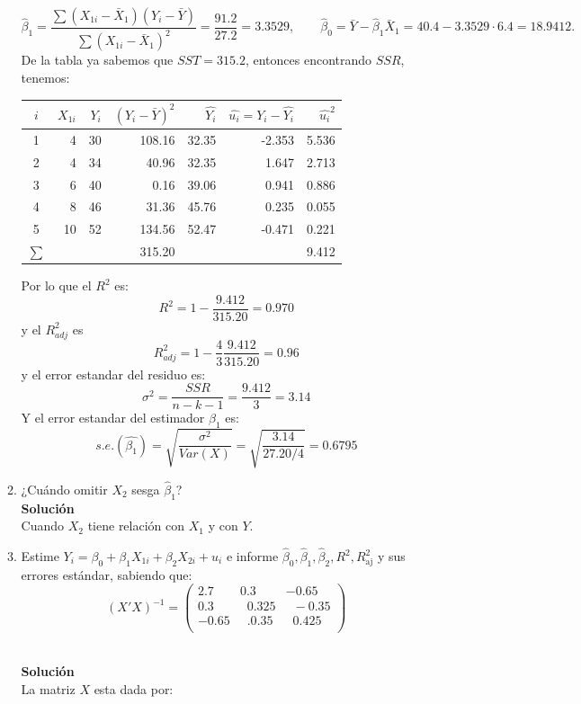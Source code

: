 \documentclass[10pt,a4paper]{article}
\begin{document}
\begin{enumerate}
\begin{enumerate}
\[
\hat\beta_1=\frac{\sum (X_{1i}-\bar X_1)(Y_i-\bar Y)}{\sum (X_{1i}-\bar X_1)^2}=\frac{91.2}{27.2}=3.3529,
\qquad
\hat\beta_0=\bar Y-\hat\beta_1\bar X_1
          =40.4-3.3529\cdot6.4=18.9412.
\]
De la tabla ya sabemos que $SST = 315.2$, entonces encontrando $SSR$, tenemos:
\begin{center}
\begin{tabular}{|c|r|r|r|r|r|r|}
\toprule
\hline
$i$ & $X_{1i}$ & $Y_i$ & 
 $(Y_i-\bar Y)^2$ & $\hat{Y_i}$ & $\hat{u_i}=Y_i - \hat{Y_i}$ & $\hat{u_i}^2$\\
\midrule
\hline
1 & 4  &  30   & 108.16 & 32.35 & -2.353 & 5.536\\
2 & 4  &  34   &  40.96 & 32.35 & 1.647  & 2.713\\
3 & 6  &  40   &   0.16 & 39.06 & 0.941  & 0.886\\
4 & 8  &  46   &  31.36 & 45.76 & 0.235  & 0.055\\
5 & 10 &  52   & 134.56 & 52.47 & -0.471 & 0.221\\
\midrule
\hline
$\sum$&   &  & 315.20  &  &  & 9.412\\
\bottomrule
\end{tabular}
\end{center}
Por lo que el $R^2$ es:
$$R^2 = 1-\frac{9.412}{315.20}=0.970$$
y el $R^2_{adj}$ es
$$R^2_{adj} = 1- \frac{4}{3}\frac{9.412}{315.20}=0.96$$
y el error estandar del residuo es:
$$\sigma^2=\frac{SSR}{n-k-1}=\frac{9.412}{3}=3.14$$
Y el error estandar del estimador $\beta_1$ es:
$$s.e.(\hat{\beta_1})=\sqrt{\frac{\sigma^2}{Var(X)}}=\sqrt{\frac{3.14}{27.20/4}}=0.6795$$
    \item ¿Cuándo omitir \(X_2\) sesga \(\hat{\beta}_1\)?
\\
\textbf{Solución}
\\
Cuando $X_2$ tiene relación con $X_1$ y con $Y$.

    \item Estime \(Y_i=\beta_0+\beta_1X_{1i}+\beta_2X_{2i}+u_i\) e informe
      \(\hat{\beta}_0,\hat{\beta}_1,\hat{\beta}_2, R^{2}, R^{2}_{\text{aj}}\) y
      sus errores estándar, sabiendo que:
      \[
(X'X)^{-1}=
\begin{pmatrix}
2.7 & 0.3 & -0.65 \\
0.3 & \;\;0.325 & \;\;-0.35 \\
-0.65 & \;\;.0.35 & \;\;0.425 \\
\end{pmatrix}
\]

\\
\textbf{Solución}
\\
La matriz $X$ esta dada por:


\end{enumerate}
\end{enumerate}
\end{document}

